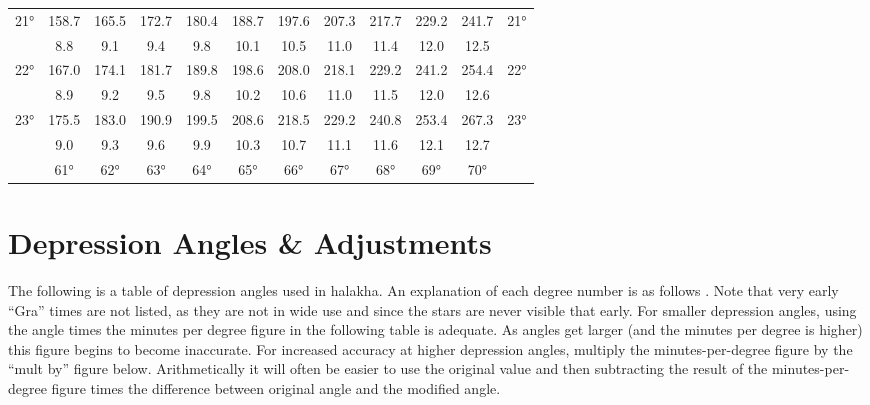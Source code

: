 \begin{footnotesize}
\begin{tabular}{c || c | c | c | c | c | c | c | c | c | c || c}
		\multirow{2}{*}{21°}&158.7&165.5&172.7&180.4&188.7&197.6&207.3&217.7&229.2&241.7&\multirow{2}{*}{21°}\\ \space&8.8&9.1&9.4&9.8&10.1&10.5&11.0&11.4&12.0&12.5&\space\\\hline
		\multirow{2}{*}{22°}&167.0&174.1&181.7&189.8&198.6&208.0&218.1&229.2&241.2&254.4&\multirow{2}{*}{22°}\\ \space&8.9&9.2&9.5&9.8&10.2&10.6&11.0&11.5&12.0&12.6&\space\\\hline
		\multirow{2}{*}{23°}&175.5&183.0&190.9&199.5&208.6&218.5&229.2&240.8&253.4&267.3&\multirow{2}{*}{23°}\\ \space&9.0&9.3&9.6&9.9&10.3&10.7&11.1&11.6&12.1&12.7&\space\\\hline
		\hline\space &61°&62°&63°&64°&65°&66°&67°&68°&69°&70°
\end{tabular}\end{footnotesize}

\section{Depression Angles \& Adjustments}

The following is a table of depression angles used in halakha.  An explanation of each degree number is as follows \parencite{dvaryom}. Note that very early “Gra” times are not listed, as they are not in wide use and since the stars are never visible that early. For smaller depression angles, using the angle times the minutes per degree figure in the following table is adequate. As angles get larger (and the minutes per degree is higher) this figure begins to become inaccurate. For increased accuracy at higher depression angles, multiply the minutes-per-degree figure by the “mult by” figure below. Arithmetically it will often be easier to use the original value and then subtracting the result of the minutes-per-degree figure times the difference between original angle and the modified angle.

